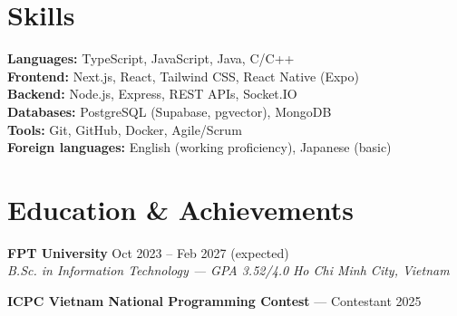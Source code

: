 \documentclass[a4paper,10pt]{article}
\newcommand{\entry}[4]{%
    \noindent\textbf{#1} \hfill #2 \\
    \noindent\textit{#3} \hfill \textit{#4}\par
}
\begin{document}
\section{Skills}
\textbf{Languages:} TypeScript, JavaScript, Java, C/C++ \\
\textbf{Frontend:} Next.js, React, Tailwind CSS, React Native (Expo) \\
\textbf{Backend:} Node.js, Express, REST APIs, Socket.IO \\
\textbf{Databases:} PostgreSQL (Supabase, pgvector), MongoDB \\
\textbf{Tools:} Git, GitHub, Docker, Agile/Scrum \\
\textbf{Foreign languages:} English (working proficiency), Japanese (basic)

\section{Education \& Achievements}
\entry{FPT University}{Oct 2023 -- Feb 2027 (expected)}
      {B.Sc. in Information Technology --- GPA 3.52/4.0}{Ho Chi Minh City, Vietnam}
\textbf{ICPC Vietnam National Programming Contest} --- Contestant \hfill 2025
\end{document}
